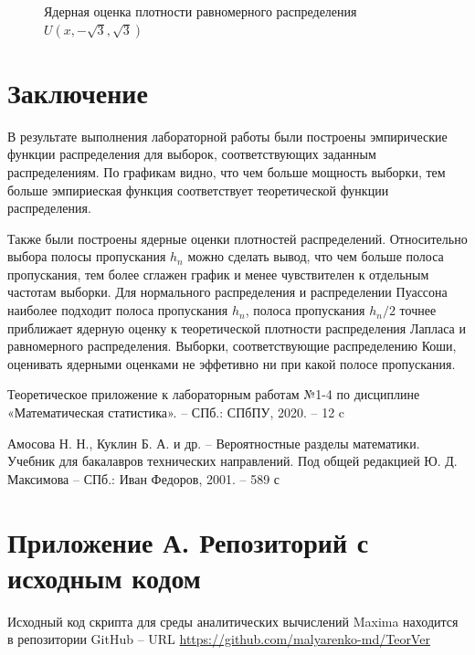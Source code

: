\documentclass[12pt]{article}
\newcommand{\lskip}{\hfill\break}
\begin{document}
\begin{flushleft}
\begin{figure}[h!]
\begin{minipage}[h]{0.325\linewidth}
         \end{minipage}
         \caption{Ядерная оценка плотности равномерного распределения $U(x, -\sqrt{3}, \sqrt{3})$}
         \end{figure}
         \lskip

\newpage

\section*{Заключение}

        В результате выполнения лабораторной работы были построены эмпирические функции распределения для выборок, соответствующих заданным распределениям. По графикам видно, что чем больше мощность выборки, тем больше эмпириеская функция соответствует теоретической функции распределения.

        Также были построены ядерные оценки плотностей распределений. Относительно выбора полосы пропускания $h_n$ можно сделать вывод, что чем больше полоса пропускания, тем более сглажен график и менее чувствителен к отдельным частотам выборки. Для нормального распределения и распределении Пуассона наиболее подходит полоса пропускания $h_n$, полоса пропускания $h_n / 2$ точнее приближает ядерную оценку к теоретической плотности распределения Лапласа и равномерного распределения. Выборки, соответствующие распределению Коши, оценивать ядерными оценками не эффетивно ни при какой полосе пропускания.

\newpage


\begin{thebibliography}{9}

        Теоретическое приложение к лабораторным работам №1-4 по дисциплине «Математическая статистика». -- СПб.: СПбПУ, 2020. -- 12 c

         Амосова Н. Н., Куклин Б. А. и др. -- Вероятностные разделы математики. Учебник для бакалавров технических направлений. Под общей редакцией Ю. Д. Максимова -- СПб.: Иван Федоров, 2001. -- 589 с  
	
\end{thebibliography}

\newpage

\section*{Приложение А. Репозиторий с исходным кодом}

Исходный код скрипта для среды аналитических вычислений Maxima находится в репозитории GitHub -- URL \url{https://github.com/malyarenko-md/TeorVer}

\end{flushleft}
\end{document}
